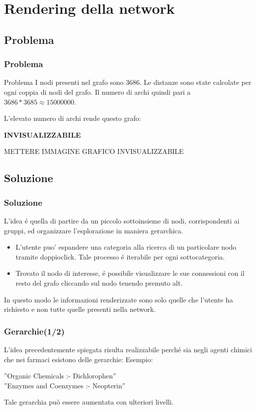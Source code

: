 \documentclass{beamer}
\begin{document}
\section{Rendering della network}
\subsection{Problema}
\begin{frame}
\frametitle{Problema}
\begin{alertblock}{Problema}
I nodi presenti nel grafo sono 3686.
Le distanze sono state calcolate per ogni coppia di nodi del grafo. Il numero di archi  quindi pari a $3686 * 3685 \approx 15000000$.
\end{alertblock}
L'elevato numero di archi rende questo grafo:\\
\begin{center}
\textbf{INVISUALIZZABILE}
\end{center}
\end{frame}

\begin{frame}
METTERE IMMAGINE GRAFICO INVISUALIZZABILE
\end{frame}

\subsection{Soluzione}
\begin{frame}
\frametitle{Soluzione}
L'idea \'e quella di partire da un piccolo sottoinsieme di nodi, corrispondenti ai gruppi, ed organizzare l'esplorazione in maniera gerarchica. 
\begin{itemize}
\item L'utente puo' espandere una categoria alla ricerca di un particolare nodo tramite doppioclick. Tale processo \'e iterabile per ogni sottocategoria.
\item Trovato il nodo di interesse, \'e possibile visualizzare le sue connessioni con il resto del grafo cliccando sul nodo tenendo premuto alt.
\end{itemize}
\medskip
In questo modo le informazioni renderizzate sono solo quelle che l'utente ha richiesto e non tutte quelle presenti nella network. 
\end{frame}

\begin{frame}
\frametitle{Gerarchie(1/2)}
L'idea precedentemente spiegata risulta realizzabile perché sia negli agenti chimici che nei farmaci esistono delle gerarchie: Esempio:\\
\medskip
\begin{center}
''Organic Chemicals :- Dichlorophen''\\
''Enzymes and Coenzymes :- Neopterin''
\end{center}
Tale gerarchia può essere aumentata con ulteriori livelli. 
\end{frame}
\end{document}
